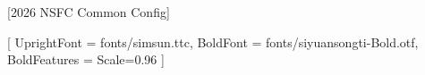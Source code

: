[2026 NSFC Common Config]

\usepackage[english]{babel}
\usepackage{xeCJK}
\usepackage{xeCJKfntef}
\usepackage{fontspec} 
\usepackage{pifont}
\usepackage{graphicx}
\usepackage{ulem}
\usepackage{setspace}
\usepackage{enumitem} %
\usepackage{amsmath}
\usepackage{mdframed}
\usepackage{xcolor}
\usepackage{amsfonts}
\usepackage{booktabs}
\usepackage[subrefformat=parens,labelformat=parens]{subfig}
\usepackage{hyperref}
\usepackage{titlesec} 
\usepackage{tcolorbox}
\usepackage{amssymb}  %
\usepackage{bm}       %



\graphicspath{{figures/}}


\usepackage[square,numbers,sort&compress]{natbib} 
\setlength{\bibsep}{1pt plus 0.3ex}

\let\oldcite\cite
\renewcommand{\cite}[1]{\textsuperscript{\oldcite{#1}}}

\renewcommand{\citep}[1]{\raisebox{0.15ex}{\oldcite{#1}}}

\newcommand{\citeauth}[1]{文献~\oldcite{#1}}

\pagestyle{empty}
\usepackage{bibunits}

\CJKsetecglue{\hskip 0.2em} %


\setmainfont{Times New Roman}
[
    UprightFont = {fonts/simsun.ttc}, 
    BoldFont    = {fonts/siyuansongti-Bold.otf},
    BoldFeatures = {Scale=0.96} 
]{}

